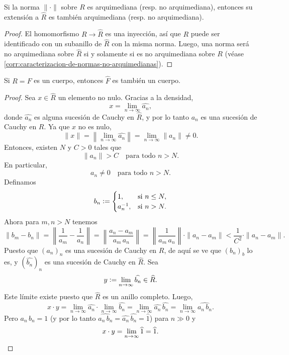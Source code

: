 \documentclass{article}
\numberwithin{equation}{section}
\theoremstyle{definition}
\begin{document}
\begin{lema}
  Si la norma $\|\cdot\|$ sobre $R$ es arquimediana (resp. no arquimediana),
  entonces su extensión a $\widehat{R}$ es también arquimediana
  (resp. no arquimediana).

  \begin{proof}
    El homomorfismo $R \to \widehat{R}$ es una inyección, así que $R$ puede ser
    identificado con un subanillo de $\widehat{R}$ con la misma norma.
    Luego, una norma será no arquimediana sobre $\widehat{R}$ si y solamente si
    es no arquimediana sobre $R$
    (véase \ref{corr:caracterizacion-de-normas-no-arquimedianas}).
  \end{proof}
\end{lema}

\begin{lema}
  Si $R = F$ es un cuerpo, entonces $\widehat{F}$ es también un cuerpo.

  \begin{proof}
    Sea $x \in \widehat{R}$ un elemento no nulo. Gracias a la densidad,
    $$x = \lim_{n\to\infty} \widehat{a_n},$$
    donde $\widehat{a_n}$ es alguna sucesión de Cauchy en $\widehat{R}$, y por
    lo tanto $a_n$ es una sucesión de Cauchy en $R$. Ya que $x$ no es nulo,
    \[ \|x\| = \left\|\lim_{n\to\infty} \widehat{a_n}\right\| =
       \lim_{n\to\infty} \|a_n\| \ne 0. \]
    Entonces, existen $N$ y $C > 0$ tales que
    $$\|a_n\| > C\quad\text{para todo }n > N.$$
    En particular,
    $$a_n \ne 0\quad\text{para todo }n > N.$$
    Definamos
    $$b_n \mathrel{\mathop:}= \begin{cases}
      1, & \text{si } n \le N,\\
      a_n^{-1}, & \text{si } n > N.
    \end{cases}$$
    Ahora para $m,n > N$ tenemos
    \[ \|b_m - b_n\| =
       \left\|\frac{1}{a_m} - \frac{1}{a_n}\right\| =
       \left\|\frac{a_n - a_m}{a_m\,a_n}\right\| =
       \left\|\frac{1}{a_m\,a_n}\right\|\cdot \|a_n - a_m\| <
       \frac{1}{C^2}\cdot \|a_n - a_m\|. \]
    Puesto que $(a_n)_n$ es una sucesión de Cauchy en $R$, de aquí se ve que
    $(b_n)_b$ lo es, y $(\widehat{b_n})_n$ es una sucesión de Cauchy en
    $\widehat{R}$. Sea
    $$y \mathrel{\mathop:}= \lim_{n\to\infty} \widehat{b_n} \in \widehat{R}.$$
    Este límite existe puesto que $\widehat{R}$ es un anillo completo.
    Luego,
    \[ x\cdot y =
       \lim_{n\to\infty} \widehat{a_n}\cdot \lim_{n\to\infty} \widehat{b_n} =
       \lim_{n\to\infty} \widehat{a_n}\,\widehat{b_n} =
       \lim_{n\to\infty} \widehat{a_n\,b_n}. \]
    Pero $a_n\,b_n = 1$ (y por lo tanto
    $\widehat{a_n\,b_n} = \widehat{a_n}\,\widehat{b_n} = \widehat{1}$)
    para $n\gg 0$ y
    \[ x\cdot y = \lim_{n\to\infty} \widehat{1} = \widehat{1}. \qedhere \]
  \end{proof}
\end{lema}
\end{document}
